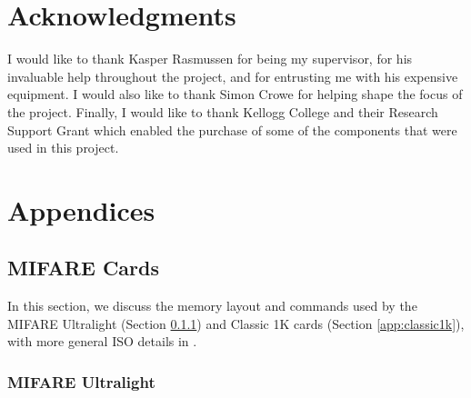 \documentclass[fleqn,10pt]{SelfArx} %
\begin{document}

\section*{Acknowledgments} %

I would like to thank Kasper Rasmussen for being my supervisor, for his invaluable help throughout the project, and for entrusting me with his expensive equipment. I would also like to thank Simon Crowe for helping shape the focus of the project. Finally, I would like to thank Kellogg College and their Research Support Grant which enabled the purchase of some of the components that were used in this project.





\onecolumn
\appendix

\section*{Appendices}
\renewcommand{\thesubsection}{\Alph{subsection}}

\subsection{MIFARE Cards}
\label{app:mifare}
In this section, we discuss the memory layout and commands used by the MIFARE Ultralight (Section \ref{app:ultralight}) and Classic 1K cards (Section \ref{app:classic1k}), with more general ISO details in \cite{iso144433}.

\subsubsection{MIFARE Ultralight \cite{ultralight}}
\label{app:ultralight}
\end{document}
